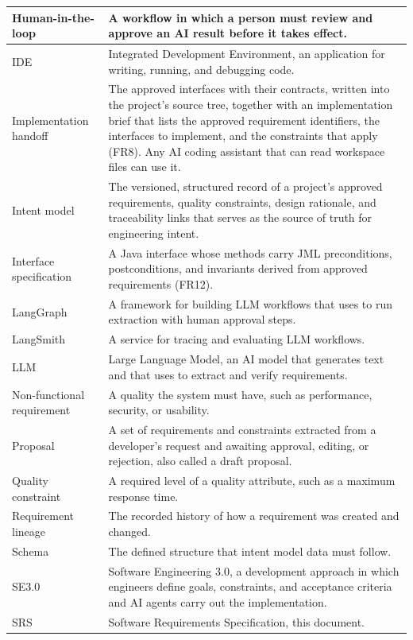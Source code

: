 \documentclass[12pt]{article}
\begin{document}
{\begin{longtable}{|>{\raggedright\arraybackslash}p{3.4cm}|p{8.9cm}|}
Human-in-the-loop & A workflow in which a person must review and approve an AI result before it takes effect.\\ \hline
IDE & Integrated Development Environment, an application for writing, running, and debugging code.\\ \hline
Implementation handoff & The approved interfaces with their contracts, written into the project's source tree, together with an implementation brief that lists the approved requirement identifiers, the interfaces to implement, and the constraints that apply (FR8). Any AI coding assistant that can read workspace files can use it.\\ \hline
Intent model & The versioned, structured record of a project's approved requirements, quality constraints, design rationale, and traceability links that serves as the source of truth for engineering intent.\\ \hline
Interface specification & A Java interface whose methods carry JML preconditions, postconditions, and invariants derived from approved requirements (FR12).\\ \hline
LangGraph & A framework for building LLM workflows that \progname{} uses to run extraction with human approval steps.\\ \hline
LangSmith & A service for tracing and evaluating LLM workflows.\\ \hline
LLM & Large Language Model, an AI model that generates text and that \progname{} uses to extract and verify requirements.\\ \hline
Non-functional requirement & A quality the system must have, such as performance, security, or usability.\\ \hline
Proposal & A set of requirements and constraints extracted from a developer's request and awaiting approval, editing, or rejection, also called a draft proposal.\\ \hline
Quality constraint & A required level of a quality attribute, such as a maximum response time.\\ \hline
Requirement lineage & The recorded history of how a requirement was created and changed.\\ \hline
Schema & The defined structure that intent model data must follow.\\ \hline
SE3.0 & Software Engineering 3.0, a development approach in which engineers define goals, constraints, and acceptance criteria and AI agents carry out the implementation.\\ \hline
SRS & Software Requirements Specification, this document.\\ \hline

\end{longtable}}
\end{document}
